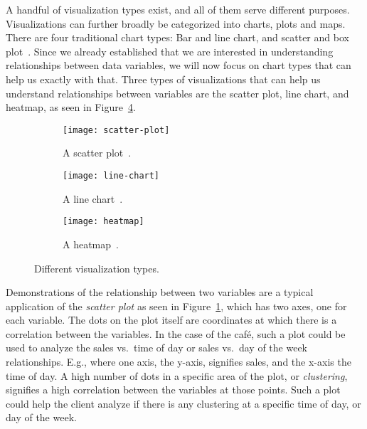 A handful of visualization types exist, and all of them serve different purposes.
Visualizations can further broadly be categorized into charts, plots and maps.
There are four traditional chart types: Bar and line chart, and scatter and box plot~\cite{atlassianChartTypes}.
Since we already established that we are interested in understanding relationships between data variables, we will now
focus on chart types that can help us exactly with that.
Three types of visualizations that can help us understand relationships between variables are the scatter plot, line
chart, and heatmap, as seen in Figure~\ref{fig:visualization-types}.

\begin{figure}[H]
    \centering
    \begin{subfigure}{.3\textwidth}
        \centering
        \texttt{[image: scatter-plot]}
        \caption{A scatter plot~\cite{atlassianChartTypes}.
        }\label{subfig:scatter-plot}
    \end{subfigure}
    \begin{subfigure}{.3\textwidth}
        \centering
        \texttt{[image: line-chart]}
        \caption{A line chart~\cite{atlassianChartTypes}.
        }\label{subfig:line-chart}
    \end{subfigure}
    \begin{subfigure}{.3\textwidth}
        \centering
        \texttt{[image: heatmap]}
        \caption{A heatmap~\cite{atlassianHeatmaps}.
        }\label{subfig:heatmap}
    \end{subfigure}
    \caption{Different visualization types.
    }\label{fig:visualization-types}
\end{figure}

Demonstrations of the relationship between two variables are a typical application of the \textit{scatter plot}
as seen in Figure~\ref{subfig:scatter-plot}, which has two axes, one for each variable.
The dots on the plot itself are coordinates at which there is a correlation between the variables.
In the case of the café, such a plot could be used to analyze the sales vs.\ time of day or sales vs.\ day of the week
relationships.
E.g., where one axis, the y-axis, signifies sales, and the x-axis the time of day.
A high number of dots in a specific area of the plot, or \textit{clustering}, signifies a high correlation between the
variables at those points.
Such a plot could help the client analyze if there is any clustering at a specific time of day, or day of the week.

